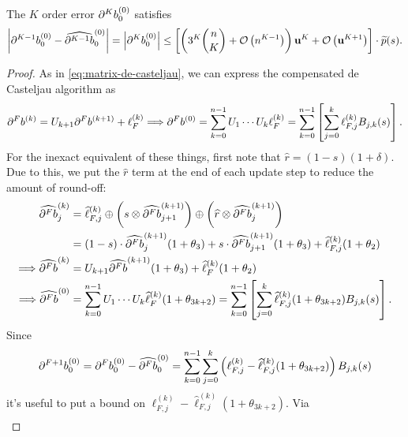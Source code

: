 \begin{lemma}\label{lemma:k-order}
The \(K\) order error \(\db{K}^{(0)}_0\) satisfies
\begin{equation}
  \left|\db{K - 1}^{(0)}_0 - \cdb{K - 1}^{(0)}_0\right| =
  \left|\db{K}^{(0)}_0\right| \leq
  \left[\left(3^{K} \binom{n}{K} + \bigO{n^{K - 1}}\right)
  \mach^{K} + \bigO{\mach^{K + 1}}\right] \cdot \widetilde{p}(s).
\end{equation}
\end{lemma}

\begin{proof}
As in \eqref{eq:matrix-de-casteljau}, we can express the compensated
de Casteljau algorithm as
\begin{equation}
\db{F}^{(k)} = U_{k + 1} \db{F}^{(k + 1)} + \ell_{F}^{(k)}
\Longrightarrow \db{F}^{(0)} = \sum_{k = 0}^{n - 1}
U_1 \cdots U_k \ell_F^{(k)} = \sum_{k = 0}^{n - 1}
\left[\sum_{j = 0}^k \ell_{F, j}^{(k)} B_{j, k}(s)\right].
\end{equation}
For the inexact equivalent of these things, first note that
\(\widehat{r} = (1 - s)(1 + \delta)\). Due to this,
we put the \(\widehat{r}\) term at the end of each update step to reduce
the amount of round-off:
\begin{align}
  \cdb{F}_j^{(k)} &=
  \widehat{\ell}_{F, j}^{(k)} \oplus
  \left(s \otimes \cdb{F}_{j + 1}^{(k + 1)}\right) \oplus
  \left(\widehat{r} \otimes \cdb{F}_j^{(k + 1)}\right) \\
&= (1 - s) \cdot \cdb{F}_j^{(k + 1)}(1 + \theta_3) +
  s \cdot \cdb{F}_{j + 1}^{(k + 1)}(1 + \theta_3) +
  \widehat{\ell}_{F, j}^{(k)} (1 + \theta_2) \\
\Longrightarrow \cdb{F}^{(k)} &=
  U_{k + 1} \cdb{F}^{(k + 1)}(1 + \theta_3) +
  \widehat{\ell}_{F}^{(k)} (1 + \theta_2) \\
\Longrightarrow \cdb{F}^{(0)} &=
  \sum_{k = 0}^{n - 1}
  U_1 \cdots U_k \widehat{\ell}_F^{(k)} (1 + \theta_{3k + 2})
  = \sum_{k = 0}^{n - 1}
  \left[\sum_{j = 0}^k \widehat{\ell}_{F, j}^{(k)} (1 + \theta_{3k + 2})
    B_{j, k}(s)\right].
\end{align}
Since
\begin{equation}
\db{F + 1}_0^{(0)} = \db{F}_0^{(0)} - \cdb{F}_0^{(0)} = \sum_{k = 0}^{n - 1}
\sum_{j = 0}^k \left(\ell_{F, j}^{(k)} -
\widehat{\ell}_{F, j}^{(k)} (1 + \theta_{3k + 2})\right) B_{j, k}(s)
\end{equation}
it's useful to put a bound on \(\ell_{F, j}^{(k)} -
\widehat{\ell}_{F, j}^{(k)} (1 + \theta_{3k + 2})\). Via
\begin{align}

\end{align}
\end{proof}

